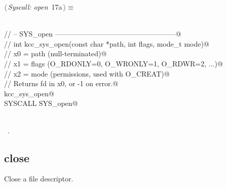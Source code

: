 \documentclass[11pt,a4paper,twoside,openright,DIV=15]{scrbook}
\theoremstyle{definition}
\theoremstyle{plain}
\theoremstyle{remark}
\begin{document}
\begin{flushleft} \small
\begin{minipage}{\linewidth}\label{scrap6}\raggedright\small
{} $\langle\,${\itshape Syscall: open}\nobreak\ {\footnotesize {17a}}$\,\rangle\equiv$
\vspace{-1ex}
\begin{list}{}{} \item
\mbox{}\verb@@\\
\mbox{}\verb@// -- SYS_open ---------------------------------------------------@\\
\mbox{}\verb@// int kcc_sys_open(const char *path, int flags, mode_t mode)@\\
\mbox{}\verb@//   x0 = path (null-terminated)@\\
\mbox{}\verb@//   x1 = flags (O_RDONLY=0, O_WRONLY=1, O_RDWR=2, ...)@\\
\mbox{}\verb@//   x2 = mode (permissions, used with O_CREAT)@\\
\mbox{}\verb@// Returns fd in x0, or -1 on error.@\\
\mbox{}\verb@FUNC kcc_sys_open@\\
\mbox{}\verb@    SYSCALL SYS_open@\\
\mbox{}\verb@ENDFUNC@\\
\mbox{}\verb@@{\NWsep}
\end{list}
\vspace{-1.5ex}
\footnotesize
\begin{list}{}{\setlength{\itemsep}{-\parsep}\setlength{\itemindent}{-\leftmargin}}
\item \NWtxtMacroRefIn\ .

\item{}
\end{list}
\end{minipage}\vspace{4ex}
\end{flushleft}
\subsection{close}

Close a file descriptor.
\end{document}
